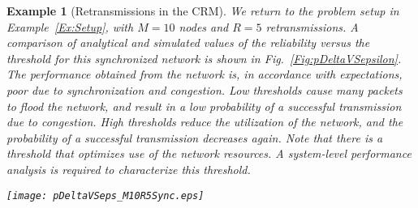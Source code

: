 \documentclass[journal]{IEEEtran}
\newtheorem{example}{Example}[section]
\begin{document}
\begin{example}[Retransmissions in the CRM] \label{Ex:Retx}
We return to the problem setup in Example~\ref{Ex:Setup}, with $M=10$ nodes and $R=5$ retransmissions. A comparison of analytical and simulated values of the reliability versus the threshold for this synchronized network is shown in Fig.~\ref{Fig:pDeltaVSepsilon}. The performance obtained from the network is, in accordance with expectations, poor due to synchronization and congestion. Low thresholds cause many packets to flood the network, and result in a low probability of a successful transmission due to congestion. High thresholds reduce the utilization of the network, and the probability of a successful transmission decreases again. Note that there is a threshold that optimizes use of the network resources. A system-level performance analysis is required to characterize this threshold.

\begin{figure*}[tb]
\begin{center}
\texttt{[image: pDeltaVSeps\_M10R5Sync.eps]}
\caption{A comparison of the analytical and simulated values of the reliability versus the scheduler threshold, with retransmissions in the CRM. This example validates Assumption~\ref{Assumption:BianchiMulti}. Note that low thresholds result in a low $\Pr(\delta_k = 1)$ due to congestion. High thresholds also result in a low $\Pr(\delta_k = 1)$, but due to under-utilization of the network. } \label{Fig:pDeltaVSepsilon}
\end{center}
\end{figure*}
\end{example}
\end{document}

